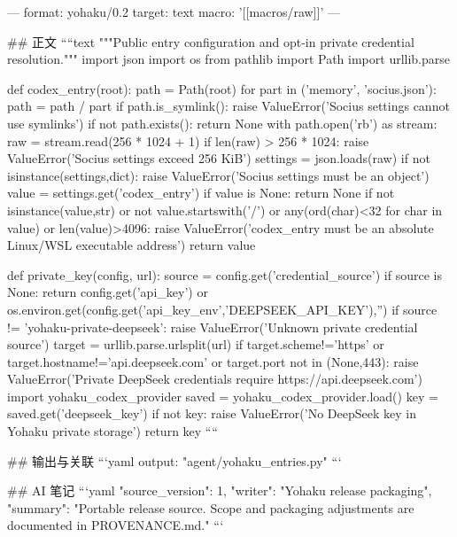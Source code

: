 ---
format: yohaku/0.2
target: text
macro: '[[macros/raw]]'
---

## 正文
````text
"""Public entry configuration and opt-in private credential resolution."""
import json
import os
from pathlib import Path
import urllib.parse


def codex_entry(root):
    path = Path(root)
    for part in ('memory', 'socius.json'):
        path = path / part
        if path.is_symlink():
            raise ValueError('Socius settings cannot use symlinks')
    if not path.exists():
        return None
    with path.open('rb') as stream:
        raw = stream.read(256 * 1024 + 1)
    if len(raw) > 256 * 1024:
        raise ValueError('Socius settings exceed 256 KiB')
    settings = json.loads(raw)
    if not isinstance(settings,dict):
        raise ValueError('Socius settings must be an object')
    value = settings.get('codex_entry')
    if value is None:
        return None
    if not isinstance(value,str) or not value.startswith('/') or any(ord(char)<32 for char in value) or len(value)>4096:
        raise ValueError('codex_entry must be an absolute Linux/WSL executable address')
    return value


def private_key(config, url):
    source = config.get('credential_source')
    if source is None:
        return config.get('api_key') or os.environ.get(config.get('api_key_env','DEEPSEEK_API_KEY'),'')
    if source != 'yohaku-private-deepseek':
        raise ValueError('Unknown private credential source')
    target = urllib.parse.urlsplit(url)
    if target.scheme!='https' or target.hostname!='api.deepseek.com' or target.port not in (None,443):
        raise ValueError('Private DeepSeek credentials require https://api.deepseek.com')
    import yohaku_codex_provider
    saved = yohaku_codex_provider.load()
    key = saved.get('deepseek_key')
    if not key:
        raise ValueError('No DeepSeek key in Yohaku private storage')
    return key
````

## 输出与关联
```yaml
output: "agent/yohaku_entries.py"
```

## AI 笔记
```yaml
{"source_version": 1, "writer": "Yohaku release packaging", "summary": "Portable release source. Scope and packaging adjustments are documented in PROVENANCE.md."}
```
